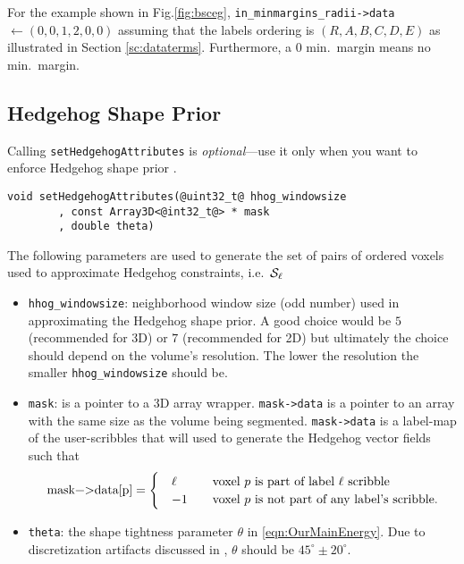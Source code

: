 \documentclass[12pt,letterpaper]{article}
\begin{document}
For the example shown in Fig.\ref{fig:bsceg}, \lstinline[mathescape=true]{in_minmargins_radii->data} $\gets (0,0,1,2,0,0)$ assuming that the labels ordering is $(R,A,B,C,D,E)$ as illustrated in Section \ref{sc:dataterms}. Furthermore, a 0 min.~margin means no min.~margin.

\subsection{Hedgehog Shape Prior}
\label{sc:hhog}
Calling \lstinline{setHedgehogAttributes} is {\em optional}---use it only when you want to enforce Hedgehog shape prior \cite{hedgehogIsack}.
\begin{lstlisting}
void setHedgehogAttributes(@uint32_t@ hhog_windowsize
		, const Array3D<@int32_t@> * mask
		, double theta)
\end{lstlisting}
The following parameters are used to generate the set of pairs of ordered voxels used to approximate Hedgehog constraints, i.e.~${\cal S}_\ell$
\begin{itemize}
\item \lstinline{hhog_windowsize}: neighborhood window size (odd number) used in approximating the Hedgehog shape prior. A good choice would be $5$ (recommended for 3D) or $7$ (recommended for 2D) but ultimately the choice should depend on the volume's resolution. The lower the resolution the smaller \lstinline{hhog_windowsize} should be.
\item \lstinline{mask}: is a pointer to a 3D array wrapper. \lstinline{mask->data} is a pointer to an array with the same size as the volume being segmented.
    \lstinline{mask->data} is a label-map of the user-scribbles that will used to generate the Hedgehog vector fields such that\\
     \begin{equation*}
     \text{\lstinline{mask->data[p]}}=
     \begin{cases}
     \quad \ell &\quad \text{voxel $p$ is part of label $\ell$ scribble}\\
     \quad -1  & \quad\text{voxel $p$ is not part of any label's scribble.}
     \end{cases}
     \end{equation*}
\item \lstinline{theta}: the shape tightness parameter $\theta$ in \eqref{eqn:OurMainEnergy}. Due to discretization artifacts discussed in \cite{pathmovesTR2017}, $\theta$ should be $45^{\circ}\pm20^{\circ}.$
\end{itemize}
\end{document}
